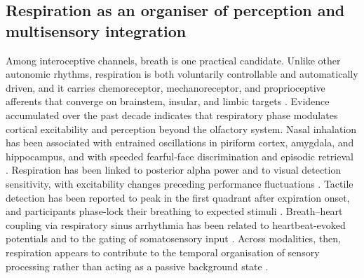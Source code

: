 \subsection{Respiration as an organiser of perception and multisensory integration}


Among interoceptive channels, breath is one practical candidate. Unlike other autonomic rhythms, respiration is both voluntarily controllable and automatically driven, and it carries chemoreceptor, mechanoreceptor, and proprioceptive afferents that converge on brainstem, insular, and limbic targets \citep{Chan2024, Varga2017, heck2017breathing, Zelano2022}. Evidence accumulated over the past decade indicates that respiratory phase modulates cortical excitability and perception beyond the olfactory system. Nasal inhalation has been associated with entrained oscillations in piriform cortex, amygdala, and hippocampus, and with speeded fearful-face discrimination and episodic retrieval \citep{zelano2016nasal, mizuhara_2023}. Respiration has been linked to posterior alpha power and to visual detection sensitivity, with excitability changes preceding performance fluctuations \citep{kluger_2021}. Tactile detection has been reported to peak in the first quadrant after expiration onset, and participants phase-lock their breathing to expected stimuli \citep{grund_2021}. Breath--heart coupling via respiratory sinus arrhythmia has been related to heartbeat-evoked potentials and to the gating of somatosensory input \citep{Zaccaro2022, Heck2022}. Across modalities, then, respiration appears to contribute to the temporal organisation of sensory processing rather than acting as a passive background state \citep{Zelano2022, Heck2022}.

